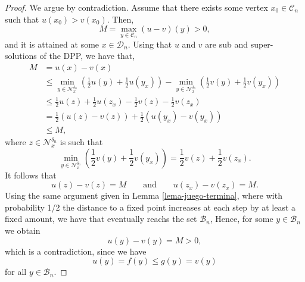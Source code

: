 \documentclass[10pt,a4paper]{amsart}
\newcommand{\B}{\mathscr{B}}
\newcommand{\C}{{\mathcal C}}
\newcommand{\Domain}{\mathcal{D}}
\newcommand{\Nc}{{\mathcal N}}
\begin{document}
\begin{proof}
We argue by contradiction. 
Assume that there exists some vertex $x_0\in\C_n$ such that $u(x_0)>v(x_0)$. 
Then,
\begin{equation}
M
=
\max_{y\in \C_n}
(u-v)(y)>0,
\end{equation}
and it is attained at some $x\in \Domain_n$.
Using that $u$ and $v$ are sub and super-solutions of the DPP, we have that,
\begin{align*}
M &
= u(x)-v(x) \\
&\displaystyle  \leq 
\min_{y\in \Nc_x^{\delta_n}} 
\left(
\frac{1}{2} 
u(y) 
+
\frac{1}{2}
u(y_x) 
\right)
-
\min_{y\in \Nc_x^{\delta_n}} 
\left(
\frac{1}{2} 
v(y) 
+
\frac{1}{2}
v(y_x) 
\right)
\\
& \displaystyle 
\leq 
\frac{1}{2} 
u(z) 
+
\frac{1}{2}
u(z_x) 
-
\frac{1}{2} 
v(z) 
-
\frac{1}{2}
v(z_x)
\\
&\displaystyle  =
\frac{1}{2} 
\left(
u(z) 
-
v(z) 
\right)
+
\frac{1}{2}
\left(
u(y_x) 
-
v(y_x)
\right)
\\
& \displaystyle  \leq M
,
\end{align*}
where $z\in \Nc_x^{\delta_n}$ is such that
\[
\min_{y\in \Nc_x^{\delta_n}} 
\left(
\frac{1}{2} 
v(y) 
+
\frac{1}{2}
v(y_x) 
\right)
=
\frac{1}{2} 
v(z) 
+
\frac{1}{2}
v(z_x)
.
\]
It follows that 
\[
u(z) 
-
v(z) 
= M
\qquad 
\text{and}
\qquad
u(z_x) 
-
v(z_x)
=
M
.
\]
Using the same argument given in Lemma \ref{lema-juego-termina}, where with probability 1/2 the distance to a fixed point increases at each step by at least a fixed amount, we have that eventually reachs the set $\B_n$,
Hence, for some $y\in \B_n$ we obtain
\[
u(y)-v(y) 
= 
M
>
0,
\]
which is a contradiction, since we have $$u(y)=f(y)\leq g(y)= v(y)$$
for all $y\in\B_n$.
\end{proof}
\end{document}
